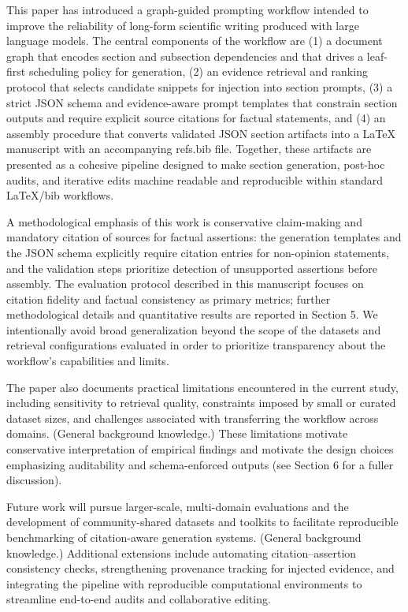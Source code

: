This paper has introduced a graph-guided prompting workflow intended to improve the reliability of long-form scientific writing produced with large language models. The central components of the workflow are (1) a document graph that encodes section and subsection dependencies and that drives a leaf-first scheduling policy for generation, (2) an evidence retrieval and ranking protocol that selects candidate snippets for injection into section prompts, (3) a strict JSON schema and evidence-aware prompt templates that constrain section outputs and require explicit source citations for factual statements, and (4) an assembly procedure that converts validated JSON section artifacts into a LaTeX manuscript with an accompanying refs.bib file. Together, these artifacts are presented as a cohesive pipeline designed to make section generation, post-hoc audits, and iterative edits machine readable and reproducible within standard LaTeX/bib workflows.

A methodological emphasis of this work is conservative claim-making and mandatory citation of sources for factual assertions: the generation templates and the JSON schema explicitly require citation entries for non-opinion statements, and the validation steps prioritize detection of unsupported assertions before assembly. The evaluation protocol described in this manuscript focuses on citation fidelity and factual consistency as primary metrics; further methodological details and quantitative results are reported in Section 5. We intentionally avoid broad generalization beyond the scope of the datasets and retrieval configurations evaluated in order to prioritize transparency about the workflow's capabilities and limits.

The paper also documents practical limitations encountered in the current study, including sensitivity to retrieval quality, constraints imposed by small or curated dataset sizes, and challenges associated with transferring the workflow across domains. (General background knowledge.) These limitations motivate conservative interpretation of empirical findings and motivate the design choices emphasizing auditability and schema-enforced outputs (see Section 6 for a fuller discussion).

Future work will pursue larger-scale, multi-domain evaluations and the development of community-shared datasets and toolkits to facilitate reproducible benchmarking of citation-aware generation systems. (General background knowledge.) Additional extensions include automating citation–assertion consistency checks, strengthening provenance tracking for injected evidence, and integrating the pipeline with reproducible computational environments to streamline end-to-end audits and collaborative editing.

